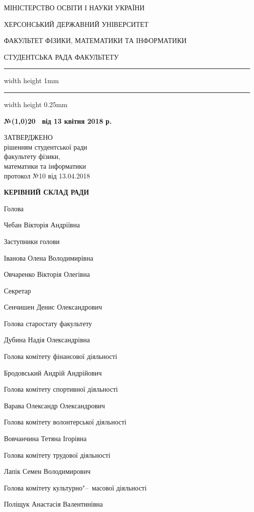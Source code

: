 \documentclass[
	a4paper,
	12pt,
	oneside,
]{extreport}
\newcommand{\heading}{\begin{center}
\parindent=0cm\parskip=-0.1cm\bfseries\footnotesize
\par МІНІСТЕРСТВО ОСВІТИ І НАУКИ УКРАЇНИ
\par ХЕРСОНСЬКИЙ ДЕРЖАВНИЙ УНІВЕРСИТЕТ
\par ФАКУЛЬТЕТ ФІЗИКИ, МАТЕМАТИКИ ТА ІНФОРМАТИКИ
\parskip=-0.2cm\par\large СТУДЕНТСЬКА РАДА ФАКУЛЬТЕТУ
\par\hrule width \hsize height 1mm \kern 0.25mm \hrule width \hsize height 0.25mm
\end{center}}
\newcommand{\Requisites}[4]{\par\noindent
\begin{minipage}[t]{80mm}
	\begin{minipage}[t]{\textwidth}
		{\par\noindent\textbf{№#1 від #2}}
	\end{minipage}
	\par	
	\begin{minipage}[t]{\textwidth}
		{\par\noindent #3}	
	\end{minipage}
\end{minipage}
\hfill
\begin{minipage}[t]{60mm}
	\par\noindent #4
\end{minipage}
}
\begin{document}
\heading
\Requisites
{\line(1,0){20}\ }
{13 квітня 2018 р.}
{}{ЗАТВЕРДЖЕНО\\
рішенням студентської ради\\
факультету фізики,\\
математики та інформатики\\
протокол №10 від 13.04.2018}

\begin{center}\textbf{\Large КЕРІВНИЙ СКЛАД РАДИ}\end{center}

{\Large

\par\noindent Голова
\par Чебан Вікторія Андріївна

\par\noindent Заступники голови
\par Іванова Олена Володимирівна
\par Овчаренко Вікторія Олегівна

\par\noindent Секретар
\par Сенчишен Денис Олександрович

\bigskip\bigskip
\par\noindent Голова старостату факультету
\par Дубина Надія Олександрівна
\bigskip\bigskip

\par\noindent Голова комітету фінансової діяльності
\par Бродовський Андрій Андрійович

\par\noindent Голова комітету спортивної діяльності
\par Варава Олександр Олександрович

\par\noindent Голова комітету волонтерської діяльності
\par Вовчанчина Тетяна Ігорівна

\par\noindent Голова комітету трудової діяльності
\par Лапік Семен Володимирович

\par\noindent Голова комітету культурно"--~масової діяльності
\par Поліщук Анастасія Валентинівна
\par 
}
\end{document}
